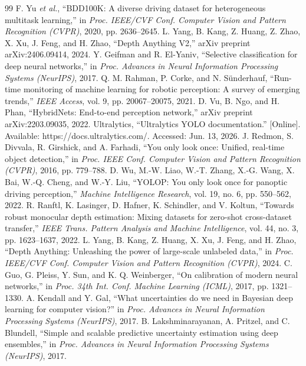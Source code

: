 \documentclass[conference,a4paper]{IEEEtran}
\begin{document}
\begin{thebibliography}{99}
 F. Yu \emph{et al.}, ``BDD100K: A diverse driving dataset for heterogeneous multitask learning,'' in \emph{Proc. IEEE/CVF Conf. Computer Vision and Pattern Recognition (CVPR)}, 2020, pp. 2636--2645.
 L. Yang, B. Kang, Z. Huang, Z. Zhao, X. Xu, J. Feng, and H. Zhao, ``Depth Anything V2,'' arXiv preprint arXiv:2406.09414, 2024.
 Y. Geifman and R. El-Yaniv, ``Selective classification for deep neural networks,'' in \emph{Proc. Advances in Neural Information Processing Systems (NeurIPS)}, 2017.
 Q. M. Rahman, P. Corke, and N. S\"underhauf, ``Run-time monitoring of machine learning for robotic perception: A survey of emerging trends,'' \emph{IEEE Access}, vol. 9, pp. 20067--20075, 2021.
 D. Vu, B. Ngo, and H. Phan, ``HybridNets: End-to-end perception network,'' arXiv preprint arXiv:2203.09035, 2022.
 Ultralytics, ``Ultralytics YOLO documentation.'' [Online]. Available: https://docs.ultralytics.com/. Accessed: Jun. 13, 2026.
 J. Redmon, S. Divvala, R. Girshick, and A. Farhadi, ``You only look once: Unified, real-time object detection,'' in \emph{Proc. IEEE Conf. Computer Vision and Pattern Recognition (CVPR)}, 2016, pp. 779--788.
 D. Wu, M.-W. Liao, W.-T. Zhang, X.-G. Wang, X. Bai, W.-Q. Cheng, and W.-Y. Liu, ``YOLOP: You only look once for panoptic driving perception,'' \emph{Machine Intelligence Research}, vol. 19, no. 6, pp. 550--562, 2022.
 R. Ranftl, K. Lasinger, D. Hafner, K. Schindler, and V. Koltun, ``Towards robust monocular depth estimation: Mixing datasets for zero-shot cross-dataset transfer,'' \emph{IEEE Trans. Pattern Analysis and Machine Intelligence}, vol. 44, no. 3, pp. 1623--1637, 2022.
 L. Yang, B. Kang, Z. Huang, X. Xu, J. Feng, and H. Zhao, ``Depth Anything: Unleashing the power of large-scale unlabeled data,'' in \emph{Proc. IEEE/CVF Conf. Computer Vision and Pattern Recognition (CVPR)}, 2024.
 C. Guo, G. Pleiss, Y. Sun, and K. Q. Weinberger, ``On calibration of modern neural networks,'' in \emph{Proc. 34th Int. Conf. Machine Learning (ICML)}, 2017, pp. 1321--1330.
 A. Kendall and Y. Gal, ``What uncertainties do we need in Bayesian deep learning for computer vision?'' in \emph{Proc. Advances in Neural Information Processing Systems (NeurIPS)}, 2017.
 B. Lakshminarayanan, A. Pritzel, and C. Blundell, ``Simple and scalable predictive uncertainty estimation using deep ensembles,'' in \emph{Proc. Advances in Neural Information Processing Systems (NeurIPS)}, 2017.

\end{thebibliography}
\end{document}
